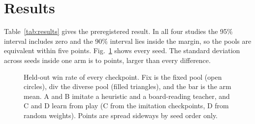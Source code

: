\documentclass[conference]{IEEEtran}
\begin{document}
\section{Results}
\label{sec:results}

\begin{table}[t]
\caption{Difference in held-out win rate, diverse minus fixed pool, in percentage points. Means are checkpoint scores over 30 seeds per arm. Intervals are cluster-bootstrap intervals over training seeds. Equivalence uses the margin of $\pm 5$ points.}
\label{tab:results}
\centering
\small

\end{table}

Table~\ref{tab:results} gives the preregistered result. In all four studies the 95\% interval includes zero and the 90\% interval lies inside the margin, so the pools are equivalent within five points. Fig.~\ref{fig:seeds} shows every seed. The standard deviation across seeds inside one arm is \SDMin{} to \SDMax{} points, larger than every difference.

\begin{figure}[t]
\centering
{}
\caption{Held-out win rate of every checkpoint. Fix is the fixed pool (open circles), div the diverse pool (filled triangles), and the bar is the arm mean. A and B imitate a heuristic and a board-reading teacher, and C and D learn from play (C from the imitation checkpoints, D from random weights). Points are spread sideways by seed order only.}
\label{fig:seeds}
\end{figure}
\end{document}
